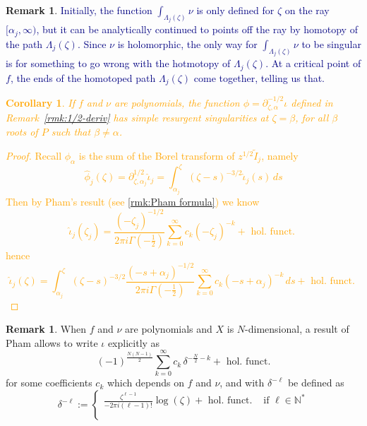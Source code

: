 \documentclass{article}
\newcommand{\fracderiv}[3]{\partial^{#1}_{#2, #3}}
\theoremstyle{definition}
\newtheorem{remark}[definition]{Remark}
\theoremstyle{plain}
\newtheorem{corollary}[theorem]{Corollary}
\begin{document}
{\begin{remark}
\textcolor{Navy}{Initially, the function $\int_{\Lambda_j(\zeta)} \nu$ is only defined for $\zeta$ on the ray $[\alpha_j, \infty)$, but it can be analytically continued to points off the ray by homotopy of the path $\Lambda_j(\zeta)$. Since $\nu$ is holomorphic, the only way for $\int_{\Lambda_j(\zeta)} \nu$ to be singular is for something to go wrong with the hotmotopy of $\Lambda_j(\zeta)$. At a critical point of $f$, the ends of the homotoped path $\Lambda_j(\zeta)$ come together, telling us that.}
\end{remark}
\textcolor{orange}{
\begin{corollary}\label{simple-res-thimble}
    If $f$ and $\nu$ are polynomials, the function ${\phi}=\fracderiv{-1/2}{\zeta}{\alpha}\iota$ defined in Remark~\ref{rmk:1/2-deriv} has simple resurgent singularities at $\zeta=\beta$, for all $\beta$ roots of $P$ such that $\beta\neq\alpha$.  
\end{corollary}
\begin{proof}
    Recall ${\phi}_\alpha$ is the sum of the Borel transform of $z^{1/2}\tilde{I}_j$, namely 
    \[\hat{\phi}_j(\zeta)=\fracderiv{1/2}{\zeta}{\alpha_j}\hat{\iota}_j=\int_{\alpha_j}^\zeta(\zeta-s)^{-3/2}\hat{\iota}_j(s)\, ds\]
    Then by Pham's result (see \eqref{rmk:Pham formula}) we know 
    \[\hat{\iota}_j(\zeta_j)=\frac{(-\zeta_j)^{-1/2}}{2\pi i\Gamma(-\tfrac{1}{2})}\sum_{k=0}^\infty c_k (-\zeta_j)^{-k} + \text{ hol. funct. }\]
hence 
\[\hat{\iota}_j(\zeta)=\int_{\alpha_j}^\zeta(\zeta-s)^{-3/2}\frac{(-s+\alpha_j)^{-1/2}}{2\pi i\Gamma(-\tfrac{1}{2})}\sum_{k=0}^\infty c_k (-s+\alpha_j)^{-k} \, ds + \text{ hol. funct. }\]
\end{proof}
}
\begin{remark}\label{rmk:Pham formula}
    When $f$ and $\nu$ are polynomials and $X$ is $N$-dimensional, a result of Pham \cite[Equation 2.4, II partie]{pham} allows to write ${\iota}$ explicitly as 
    \begin{equation}\label{eqn:Pham}
        (-1)^{\frac{N(N-1)}{2}}  \sum_{k=0}^\infty c_k\, \delta^{-\frac{N}{2}-k}+ \text{ hol. funct.}
    \end{equation}
    for some coefficients $c_k$ which depends on $f$ and $\nu$, and with $\delta^{-\ell}$ be defined as
   \begin{equation*}
       \delta^{-\ell}:=\begin{cases}
           \frac{\zeta^{\ell-1}}{-2\pi i(\ell-1)!}\log(\zeta) + \text{ hol. funct.} & \text{ if } \ell\in\mathbb{N}^*\\
           & \\

\end{cases}
\end{equation*}
\end{remark}}
\end{document}
